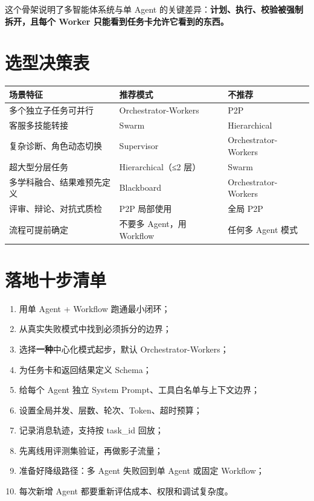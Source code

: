 \documentclass[9pt,a4paper,twocolumn]{ctexart}
\begin{document}
这个骨架说明了多智能体系统与单 Agent 的关键差异：\textbf{计划、执行、校验被强制拆开，且每个 Worker 只能看到任务卡允许它看到的东西。}



\section*{选型决策表}

{\footnotesize
\begin{tabular}{|p{}|p{}|p{}|}
\hline
\textbf{场景特征} & \textbf{推荐模式} & \textbf{不推荐} \\
\hline
多个独立子任务可并行 & Orchestrator-Workers & P2P \\
\hline
客服多技能转接 & Swarm & Hierarchical \\
\hline
复杂诊断、角色动态切换 & Supervisor & Orchestrator-Workers \\
\hline
超大型分层任务 & Hierarchical（≤2 层） & Swarm \\
\hline
多学科融合、结果难预先定义 & Blackboard & Orchestrator-Workers \\
\hline
评审、辩论、对抗式质检 & P2P 局部使用 & 全局 P2P \\
\hline
流程可提前确定 & 不要多 Agent，用 Workflow & 任何多 Agent 模式 \\
\hline
\end{tabular}
}



\section*{落地十步清单}

\begin{enumerate}[itemsep=1pt, topsep=2pt]
  \item 用单 Agent + Workflow 跑通最小闭环；
  \item 从真实失败模式中找到必须拆分的边界；
  \item 选择\textbf{一种}中心化模式起步，默认 Orchestrator-Workers；
  \item 为任务卡和返回结果定义 Schema；
  \item 给每个 Agent 独立 System Prompt、工具白名单与上下文边界；
  \item 设置全局并发、层数、轮次、Token、超时预算；
  \item 记录消息轨迹，支持按 task\_id 回放；
  \item 先离线用评测集验证，再做影子流量；
  \item 准备好降级路径：多 Agent 失败回到单 Agent 或固定 Workflow；
  \item 每次新增 Agent 都要重新评估成本、权限和调试复杂度。
\end{enumerate}
\end{document}
